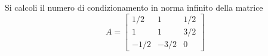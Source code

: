 Si calcoli il numero di condizionamento in norma infinito della
matrice
\bigskip
\[
A=\left[
\begin{array}{ccc}
1/2 & 1 & 1/2 \\
1 & 1 & 3/2\\
-1/2 & -3/2 & 0
\end{array}\right]
\]
